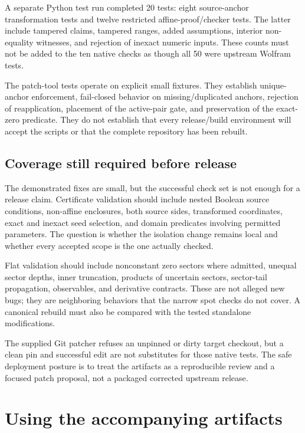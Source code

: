 \documentclass[11pt,a4paper]{article}
\begin{document}
A separate Python test run completed 20 tests: eight source-anchor transformation tests and twelve restricted affine-proof/checker tests. The latter include tampered claims, tampered ranges, added assumptions, interior non-equality witnesses, and rejection of inexact numeric inputs. These counts must not be added to the ten native checks as though all 50 were upstream Wolfram tests.

The patch-tool tests operate on explicit small fixtures. They establish unique-anchor enforcement, fail-closed behavior on missing/duplicated anchors, rejection of reapplication, placement of the active-pair gate, and preservation of the exact-zero predicate. They do not establish that every release/build environment will accept the scripts or that the complete repository has been rebuilt.

\subsection{Coverage still required before release}
The demonstrated fixes are small, but the successful check set is not enough for a release claim. Certificate validation should include nested Boolean source conditions, non-affine enclosures, both source sides, transformed coordinates, exact and inexact seed selection, and domain predicates involving permitted parameters. The question is whether the isolation change remains local and whether every accepted scope is the one actually checked.

Flat validation should include nonconstant zero sectors where admitted, unequal sector depths, inner truncation, products of uncertain sectors, sector-tail propagation, observables, and derivative contracts. These are not alleged new bugs; they are neighboring behaviors that the narrow spot checks do not cover. A canonical rebuild must also be compared with the tested standalone modifications.

The supplied Git patcher refuses an unpinned or dirty target checkout, but a clean pin and successful edit are not substitutes for those native tests. The safe deployment posture is to treat the artifacts as a reproducible review and a focused patch proposal, not a packaged corrected upstream release.

\section{Using the accompanying artifacts}
\end{document}
